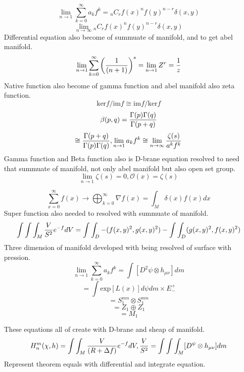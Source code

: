 \documentclass{jsarticle}
\begin{document}
 $$ \lim_{n \to 1}\sum_{k=0}^{\infty}a_k f^k = {}_nC_{r}f(x)^nf(y)^{n-r} \delta(x,y) $$
 $$ \lim_{n \to \infty}{}_nC_{r}f(x)^nf(y)^{n-r} \delta (x,y) $$
 Differential equation also become of summuate of manifold, and to get abel manifold.
 $$ \lim_{n \to 1}\sum_{k=0}^{\infty}\left({1 \over (n + 1)}\right)^s = \lim_{n \to 1}Z^r = {1 \over z} $$
 Native function also become of gamma function and abel manifold also zeta function.
 $$ \mathrm{ker}f/\mathrm{im}f \cong \mathrm{im}f/\mathrm{ker}f $$
 $$ \beta(p,q) = {\Gamma(p)\Gamma(q) \over \Gamma(p+q)}  $$
 $$ \cong {\Gamma(p+q) \over \Gamma(p) \Gamma(q)}, \lim_{n \to 1} a_kf^k \cong \lim_{n \to \infty}{\zeta(s)
   \over a^kf^k} $$
 Gamma function and Beta function also is D-brane equation resolved to need that
summuate of manifold, not only abel manifold but also open set group.
   $$ \lim_{n \to 1}\zeta(s) = 0, \mathcal{O}(x) = \zeta(s) $$

   $$ \sum_{x=0}^{\infty}f(x) \to \bigoplus_{k=0}^{\infty}\nabla f(x) = \int_M \delta(x)f(x)dx $$
   Super function also needed to resolved with summuate of manifold.
   $$ \int \int \int_M {V \over S^2}e^{-f}dV = \int \int_D - (f(x,y)^2, g(x,y)^2) 
   - \int \int_D (g(x,y)^2, f(x,y)^2) $$
   Three dimension of manifold developed with being resolved of surface with pression.
   $$ \lim_{n \to 1}\sum_{k=0}^{\infty}a_kf^k = \int [D^2 \psi \otimes h_{\mu\nu}]dm $$
   $$ = \int \mathrm{exp}[L(x)]d\psi dm \times E^{+}_{-} $$
   $$ = S^{mn}_1 \otimes S^{mn}_1 $$
   $$ = Z_1 \oplus Z_1$$
   $$ = M_1 $$

   These equations all of create with D-brane and sheap of manifold.
   $$ H^m_n(\chi,h) = \int \int_M {V \over (R + \Delta f)}e^{-f}dV, {V \over S^2} = \int \int \int_M[D^\psi 
   \otimes h_{\mu\nu}]dm $$
   Represent theorem equals with differential and integrate equation.
\end{document}
